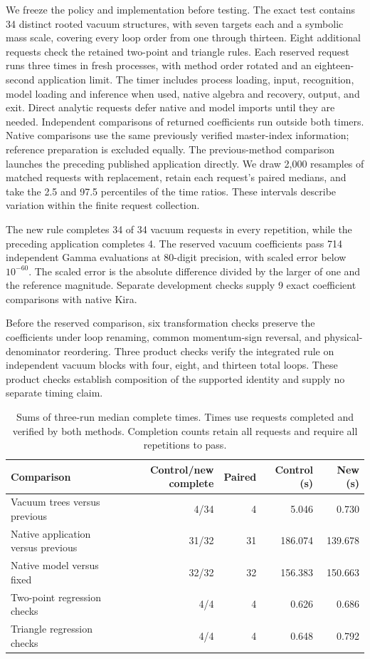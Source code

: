 We freeze the policy and implementation before testing. The exact test contains 34 distinct rooted vacuum structures, with seven targets each and a symbolic mass scale, covering every loop order from one through thirteen. Eight additional requests check the retained two-point and triangle rules. Each reserved request runs three times in fresh processes, with method order rotated and an eighteen-second application limit. The timer includes process loading, input, recognition, model loading and inference when used, native algebra and recovery, output, and exit. Direct analytic requests defer native and model imports until they are needed. Independent comparisons of returned coefficients run outside both timers. Native comparisons use the same previously verified master-index information; reference preparation is excluded equally. The previous-method comparison launches the preceding published application directly. We draw 2,000 resamples of matched requests with replacement, retain each request's paired medians, and take the 2.5 and 97.5 percentiles of the time ratios. These intervals describe variation within the finite request collection.

The new rule completes 34 of 34 vacuum requests in every repetition, while the preceding application completes 4. The reserved vacuum coefficients pass 714 independent Gamma evaluations at 80-digit precision, with scaled error below $10^{-60}$. The scaled error is the absolute difference divided by the larger of one and the reference magnitude. Separate development checks supply 9 exact coefficient comparisons with native Kira.

Before the reserved comparison, six transformation checks preserve the coefficients under loop renaming, common momentum-sign reversal, and physical-denominator reordering. Three product checks verify the integrated rule on independent vacuum blocks with four, eight, and thirteen total loops. These product checks establish composition of the supported identity and supply no separate timing claim.

\begin{table}[!htbp]\centering\small
\caption{Sums of three-run median complete times. Times use requests completed and verified by both methods. Completion counts retain all requests and require all repetitions to pass.}
\label{tab:notes-vac-ml}
\begin{tabularx}{\linewidth}{@{}Yrrrr@{}}\toprule
Comparison & Control/new complete & Paired & Control (s) & New (s)\\\midrule
Vacuum trees versus previous & 4/34 & 4 & 5.046 & 0.730 \\
Native application versus previous & 31/32 & 31 & 186.074 & 139.678 \\
Native model versus fixed & 32/32 & 32 & 156.383 & 150.663 \\
Two-point regression checks & 4/4 & 4 & 0.626 & 0.686 \\
Triangle regression checks & 4/4 & 4 & 0.648 & 0.792 \\
\bottomrule\end{tabularx}\end{table}

